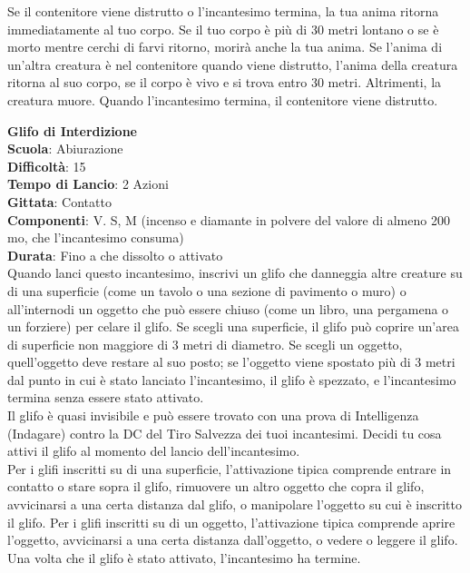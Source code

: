 \begin{multicols}{2}
Se il contenitore viene distrutto o l'incantesimo termina, la tua anima ritorna immediatamente al tuo corpo. Se il tuo corpo è più di 30 metri lontano o se è morto mentre cerchi di farvi ritorno, morirà anche la tua anima. Se l’anima di un'altra creatura è nel contenitore quando viene distrutto, l’anima della creatura ritorna al suo corpo, se il corpo è vivo e si trova entro 30 metri. Altrimenti, la creatura muore. Quando l'incantesimo termina, il contenitore viene distrutto.

\medskip\textbf{Glifo di Interdizione}\\
\textbf{Scuola}: Abiurazione\\
\textbf{Difficoltà}:  15\\
\textbf{Tempo di Lancio}: 2 Azioni\\
\textbf{Gittata}: Contatto\\
\textbf{Componenti}: V. S, M (incenso e diamante in polvere del valore di almeno 200 mo, che l'incantesimo consuma)\\
\textbf{Durata}: Fino a che dissolto o attivato \\
Quando lanci questo incantesimo, inscrivi un glifo che danneggia altre creature su di una superficie (come un tavolo o una sezione di pavimento o muro) o all'internodi un oggetto che può essere chiuso (come un libro, una pergamena o un forziere) per celare il glifo. Se scegli una superficie, il glifo può coprire un'area di superficie non maggiore di 3 metri di diametro. Se scegli un oggetto, quell'oggetto deve restare al suo posto; se l’oggetto viene spostato più di 3 metri dal punto in cui è stato lanciato l'incantesimo, il glifo è spezzato, e l'incantesimo termina senza essere stato attivato.\\
Il glifo è quasi invisibile e può essere trovato con una prova di Intelligenza (Indagare) contro la DC del Tiro Salvezza dei tuoi incantesimi. Decidi tu cosa attivi il glifo al momento del lancio dell'incantesimo.\\
Per i glifi inscritti su di una superficie, l’attivazione tipica comprende entrare in contatto o stare sopra il glifo, rimuovere un altro oggetto che copra il glifo, avvicinarsi a una certa distanza dal glifo, o manipolare l’oggetto su cui è inscritto il glifo. Per i glifi inscritti su di un oggetto, l’attivazione tipica comprende aprire l’oggetto, avvicinarsi a una certa distanza dall'oggetto, o vedere o leggere il glifo. Una volta che il glifo è stato attivato, l'incantesimo ha termine.\\

\end{multicols}
